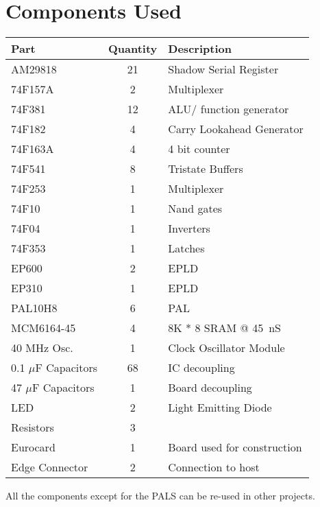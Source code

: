 \chapter{Components Used}

\begin{center}
\begin{tabular}{|l|c|l|}
\hline
Part	&	Quantity &	Description\\
\hline

AM29818	&	21&		Shadow Serial Register\\
74F157A	&	2&		Multiplexer\\
74F381	&	12&		ALU/ function generator\\
74F182	&	4&		Carry Lookahead Generator\\
74F163A	&	4&		4 bit  counter\\
74F541	&	8&		Tristate Buffers\\
74F253	&	1&		Multiplexer\\
74F10	&	1&		Nand gates\\
74F04	&	1&		Inverters\\
74F353	&	1&		Latches\\
EP600	&	2&		EPLD\\
EP310	&	1&		EPLD\\
PAL10H8	&	6&		PAL\\
MCM6164-45&	4&		8K * 8 SRAM @ 45~nS\\
40 MHz Osc.&	1&		Clock Oscillator Module\\

0.1 $\mu$F Capacitors&	68&	IC decoupling\\
47 $\mu$F Capacitors&		1&	Board decoupling\\
LED	&	2&		Light Emitting Diode\\	
Resistors &      3&		\\
Eurocard&	1&		Board used for construction\\
Edge Connector & 2&		Connection to host\\
\hline
\end{tabular}



All the components except for the PALS can be re-used in other projects.
\end{center}

